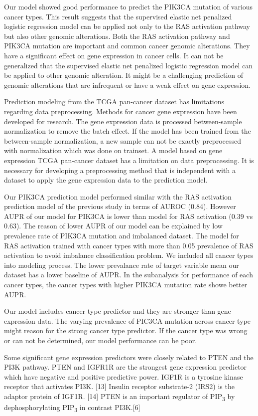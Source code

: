 \documentclass[10pt,letterpaper]{article}
\begin{document}
Our model showed good performance to predict the PIK3CA mutation of
various cancer types. This result suggests that the supervised elastic
net penalized logistic regression model can be applied not only to the
RAS activation pathway but also other genomic alterations. Both the RAS
activation pathway and PIK3CA mutation are important and common cancer
genomic alterations. They have a significant effect on gene expression
in cancer cells. It can not be generalized that the supervised elastic
net penalized logistic regression model can be applied to other genomic
alteration. It might be a challenging prediction of genomic alterations
that are infrequent or have a weak effect on gene expression.

Prediction modeling from the TCGA pan-cancer dataset has limitations
regarding data preprocessing. Methods for cancer gene expression have
been developed for research. The gene expression data is processed
between-sample normalization to remove the batch effect. If the model
has been trained from the between-sample normalization, a new sample can
not be exactly preprocessed with normalization which was done on
trainset. A model based on gene expression TCGA pan-cancer dataset has a
limitation on data preprocessing. It is necessary for developing a
preprocessing method that is independent with a dataset to apply the
gene expression data to the prediction model.

Our PIK3CA prediction model performed similar with the RAS activation
prediction model of the previous study in terms of AUROC (0.84). However
AUPR of our model for PIK3CA is lower than model for RAS activation
(0.39 vs 0.63). The reason of lower AUPR of our model can be explained
by low prevalence rate of PIK3CA mutation and imbalanced dataset. The
model for RAS activation trained with cancer types with more than 0.05
prevalence of RAS activation to avoid imbalance classification problem.
We included all cancer types into modeling process. The lower prevalance
rate of target variable mean our dataset has a lower baseline of AUPR.
In the subanalysis for performance of each cancer types, the cancer
types with higher PIK3CA mutation rate showe better AUPR.

Our model includes cancer type predictor and they are stronger than gene
expression data. The varying prevalence of PIC3CA mutation across cancer
type might reason for the strong cancer type predictor. If the cancer
type was wrong or can not be determined, our model performance can be
poor.

Some significant gene expression predictors were closely related to PTEN
and the PI3K pathway. PTEN and IGFR1R are the strongest gene expression
predictor which have negative and positive predictive power. IGF1R is a
tyrosine kinase receptor that activates PI3K. {[}13{]} Insulin receptor
substrate-2 (IRS2) is the adaptor protein of IGF1R. {[}14{]} PTEN is an
important regulator of PIP\textsubscript{3} by dephosphorylating
PIP\textsubscript{3} in contrast PI3K.{[}6{]}
\end{document}
